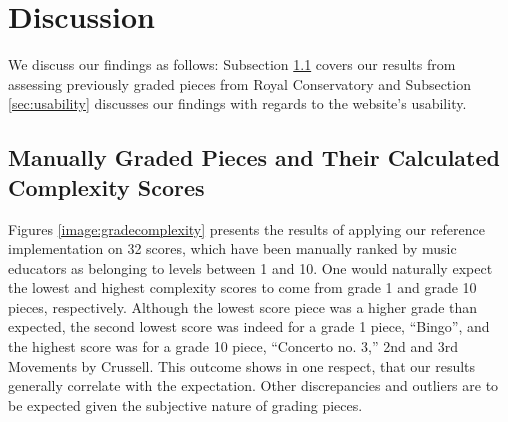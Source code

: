 \documentclass[10pt,preprint]{sigplanconf}
\begin{document}


\section{Discussion} 
\label{sec:discus}

We discuss our findings as follows: Subsection \ref{sec:grades} covers our results from assessing previously graded pieces from Royal Conservatory  and Subsection \ref{sec:usability} discusses our findings with regards to the website's usability.


\subsection{Manually Graded Pieces and Their Calculated Complexity Scores}
\label{sec:grades}

Figures \ref{image:gradecomplexity} presents the results of applying our reference implementation on 32 scores, which have been manually ranked by music educators as belonging to levels between 1 and 10. 
One would naturally expect the lowest and highest complexity scores to come from grade 1 and grade 10 pieces, respectively. Although the lowest score piece was a higher grade than expected, the second lowest score was indeed for a grade 1 piece, ``Bingo'', and the highest score was for a grade 10 piece, ``Concerto no. 3,'' 2nd and 3rd Movements by Crussell. This outcome shows in one respect, that our results generally correlate with the expectation. Other discrepancies and outliers are to be expected given the subjective nature of grading pieces.
\end{document}
